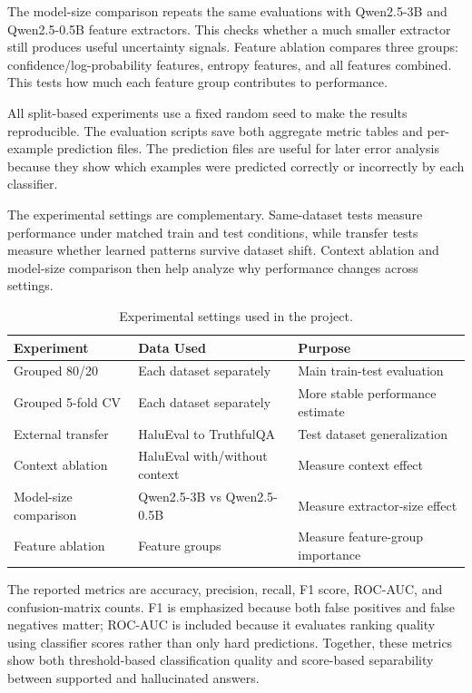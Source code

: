 \documentclass[11pt]{article}
\begin{document}
The model-size comparison repeats the same evaluations with Qwen2.5-3B and Qwen2.5-0.5B feature extractors. This checks whether a much smaller extractor still produces useful uncertainty signals. Feature ablation compares three groups: confidence/log-probability features, entropy features, and all features combined. This tests how much each feature group contributes to performance.

All split-based experiments use a fixed random seed to make the results reproducible. The evaluation scripts save both aggregate metric tables and per-example prediction files. The prediction files are useful for later error analysis because they show which examples were predicted correctly or incorrectly by each classifier.

The experimental settings are complementary. Same-dataset tests measure performance under matched train and test conditions, while transfer tests measure whether learned patterns survive dataset shift. Context ablation and model-size comparison then help analyze why performance changes across settings.

\begin{table}[H]
    \centering
    \footnotesize
    \begin{tabular}{lll}
        \toprule
        Experiment & Data Used & Purpose \\
        \midrule
        Grouped 80/20 & Each dataset separately & Main train-test evaluation \\
        Grouped 5-fold CV & Each dataset separately & More stable performance estimate \\
        External transfer & HaluEval to TruthfulQA & Test dataset generalization \\
        Context ablation & HaluEval with/without context & Measure context effect \\
        Model-size comparison & Qwen2.5-3B vs Qwen2.5-0.5B & Measure extractor-size effect \\
        Feature ablation & Feature groups & Measure feature-group importance \\
        \bottomrule
    \end{tabular}
    \caption{Experimental settings used in the project.}
    \label{tab:experimental-settings}
\end{table}

The reported metrics are accuracy, precision, recall, F1 score, ROC-AUC, and confusion-matrix counts. F1 is emphasized because both false positives and false negatives matter; ROC-AUC is included because it evaluates ranking quality using classifier scores rather than only hard predictions. Together, these metrics show both threshold-based classification quality and score-based separability between supported and hallucinated answers.
\end{document}
